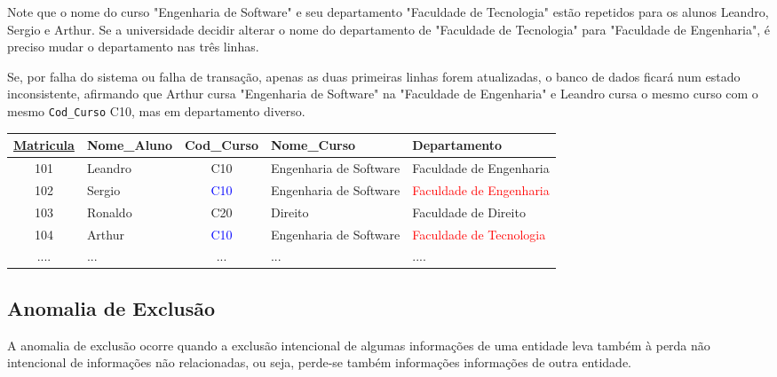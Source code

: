 \begin{tcolorbox}[breakable, colback=blue!5,colframe=blue!40!black,title=Situação exemplo]
    Note que o nome do curso "Engenharia de Software" e seu departamento "Faculdade de Tecnologia" estão repetidos para os alunos Leandro, Sergio e Arthur. Se a universidade decidir alterar o nome do departamento de "Faculdade de Tecnologia" para "Faculdade de Engenharia", é preciso mudar o departamento nas três linhas. 

    Se, por falha do sistema ou falha de transação, apenas as duas primeiras linhas forem atualizadas, o banco de dados ficará num estado inconsistente, afirmando que Arthur cursa "Engenharia de Software" na "Faculdade de Engenharia" e Leandro cursa o mesmo curso com o mesmo \texttt{Cod\_Curso} C10, mas em departamento diverso.

    \vspace{0.5cm}

    \centering
    \renewcommand{\arraystretch}{1.2}

    \begin{adjustbox}{max width=\textwidth}
    \begin{tabular}{|c|l|c|l|l|}
    \hline
    \textbf{\underline{Matricula}} & \textbf{Nome\_Aluno} & \textbf{Cod\_Curso} & \textbf{Nome\_Curso} & \textbf{Departamento} \\ \hline
    101 & Leandro & C10 & Engenharia de Software & Faculdade de Engenharia \\ \hline
    102 & Sergio & \textcolor{blue}{C10} & Engenharia de Software & \textcolor{red}{Faculdade de Engenharia} \\ \hline
    103 & Ronaldo & C20 & Direito & Faculdade de Direito \\ \hline
    104 & Arthur & \textcolor{blue}{C10} & Engenharia de Software & \textcolor{red}{Faculdade de Tecnologia} \\ \hline
    .... & ... & ... & ... & .... \\ \hline
    \end{tabular}
\end{adjustbox}
    \label{tab:anomaliaat_exemplo}
\end{tcolorbox}

\subsection{Anomalia de Exclusão}
A anomalia de exclusão ocorre quando a exclusão intencional de algumas informações de uma entidade leva também à perda não intencional de informações não relacionadas, ou seja, perde-se também informações informações de outra entidade.\cite{ramakrishnan2011}

